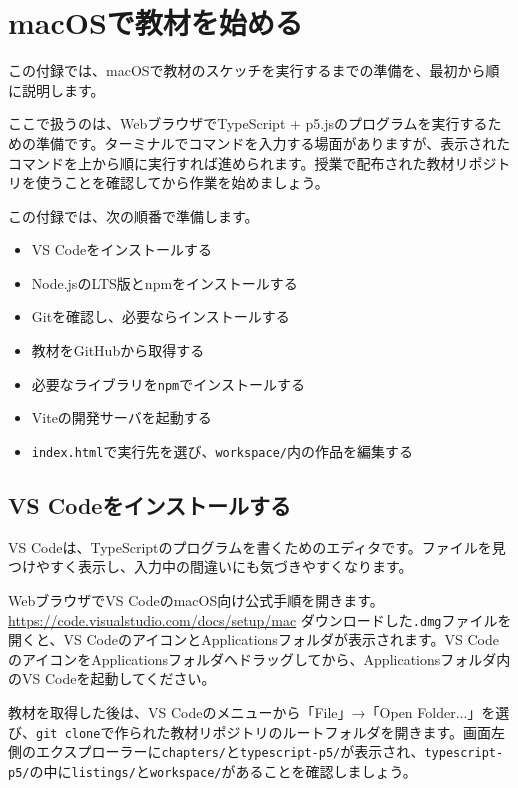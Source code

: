\chapter{macOSで教材を始める}
\label{app:macos-setup}

この付録では、macOSで教材のスケッチを実行するまでの準備を、最初から順に説明します。

ここで扱うのは、WebブラウザでTypeScript + p5.jsのプログラムを実行するための準備です。ターミナルでコマンドを入力する場面がありますが、表示されたコマンドを上から順に実行すれば進められます。授業で配布された教材リポジトリを使うことを確認してから作業を始めましょう。

この付録では、次の順番で準備します。

\begin{itemize}
    \item VS Codeをインストールする
    \item Node.jsのLTS版とnpmをインストールする
    \item Gitを確認し、必要ならインストールする
    \item 教材をGitHubから取得する
    \item 必要なライブラリを\texttt{npm}でインストールする
    \item Viteの開発サーバを起動する
    \item \texttt{index.html}で実行先を選び、\texttt{workspace/}内の作品を編集する
\end{itemize}

\section{VS Codeをインストールする}

VS Codeは、TypeScriptのプログラムを書くためのエディタです。ファイルを見つけやすく表示し、入力中の間違いにも気づきやすくなります。

WebブラウザでVS CodeのmacOS向け公式手順を開きます。
\url{https://code.visualstudio.com/docs/setup/mac}
ダウンロードした\texttt{.dmg}ファイルを開くと、VS CodeのアイコンとApplicationsフォルダが表示されます。VS CodeのアイコンをApplicationsフォルダへドラッグしてから、Applicationsフォルダ内のVS Codeを起動してください。

教材を取得した後は、VS Codeのメニューから「File」→「Open Folder...」を選び、\texttt{git clone}で作られた教材リポジトリのルートフォルダを開きます。画面左側のエクスプローラーに\texttt{chapters/}と\texttt{typescript-p5/}が表示され、\texttt{typescript-p5/}の中に\texttt{listings/}と\texttt{workspace/}があることを確認しましょう。

